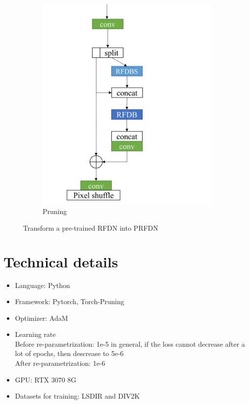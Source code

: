 \documentclass[10pt,twocolumn,letterpaper]{article}
\begin{document}
\begin{figure}
\begin{subfigure}[b]{0.246\linewidth}
        \includegraphics[width=\textwidth]{../Pruning.pdf}
        \caption{Pruning}
        \label{fig:Pruning}
    \end{subfigure}
    \caption{Transform a pre-trained RFDN into PRFDN}
    \label{fig:PRFDN}
\end{figure}


\section{Technical details}
\begin{itemize}
    \item Language: Python
    \item Framework: Pytorch, Torch-Pruning\cite{fang2023depgraph}
    \item Optimizer: AdaM
    \item Learning rate\\Before re-parametrization: 1e-5 in general, if the loss cannot decrease after a lot of epochs, then descrease to 5e-6\\After re-parametrization: 1e-6
    \item GPU: RTX 3070 8G
    \item Datasets for training: LSDIR and DIV2K
\end{itemize}
\end{document}
